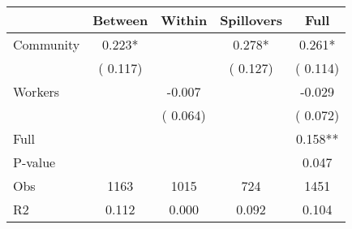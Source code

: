 
\begin{tabular}{l*{4}{c}}\hline&\multicolumn{1}{c}{Between}&\multicolumn{1}{c}{Within}&\multicolumn{1}{c}{Spillovers}&\multicolumn{1}{c}{Full}\\ \hline
 Community             &              0.223*      &                                               &        0.278* &         0.261*                            \\ 
                               &        (       0.117)           &                                       &       (       0.127)     &      (       0.114)                                           \\ 
 Workers       &                                               &       -0.007    &                                &            -0.029                            \\ 
                               &                                               & (       0.064)                  &                                        &      (       0.072)                                           \\ 
\hline                                                                                                                                                                                                                                            
 Full                  &                                               &                                               &                                        &             0.158**                                     \\ 
 P-value               &                                               &                                               &                                        &             0.047                                           \\ 
 Obs                   &               1163               &       1015                       &       724                &              1451                                               \\ 
 R2                    &                      0.112              &              0.000                      &              0.092               &                     0.104                                              \\ 
\hline \end{tabular}                                                                                                                                                                                                              